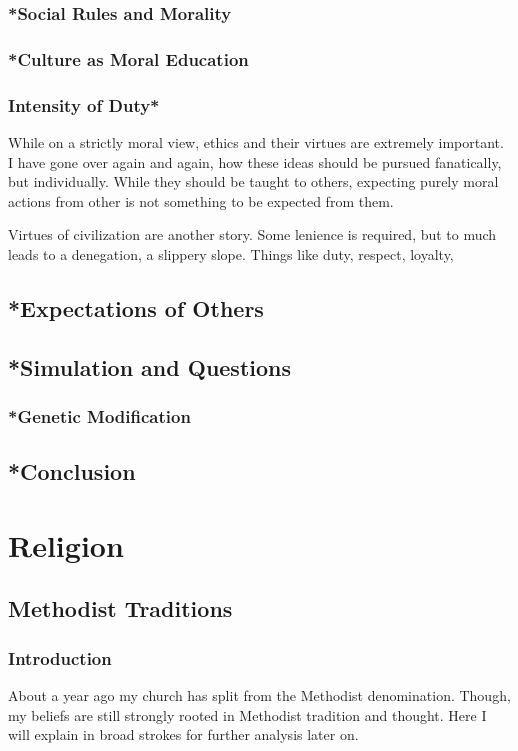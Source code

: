 \subsection{*Social Rules and Morality}
\subsection{*Culture as Moral Education}
\subsection{Intensity of Duty*}
\par While on a strictly moral view, ethics and their virtues are extremely important. I have gone over again and again, how these ideas should be pursued fanatically, but individually. While they should be taught to others, expecting purely moral actions from other is not something to be expected from them.
\par Virtues of civilization are another story. Some lenience is required, but to much leads to a denegation, a slippery slope. Things like duty, respect, loyalty, 
\section{*Expectations of Others}
\section{*Simulation and Questions}
\subsection{*Genetic Modification}
\section{*Conclusion}
\chapter{Religion}
\section{Methodist Traditions}
\subsection{Introduction}
\par About a year ago my church has split from the Methodist denomination. Though, my beliefs are still strongly rooted in Methodist tradition and thought. Here I will explain in broad strokes for further analysis later on.
